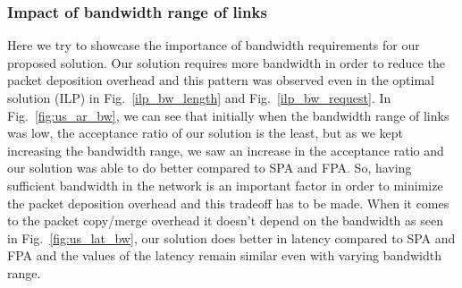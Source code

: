 \documentclass[journal]{IEEEtran}
\begin{document}
\subsubsection{Impact of bandwidth range of links}
Here we try to showcase the importance of bandwidth requirements for our proposed solution. Our solution requires more bandwidth in order to reduce the packet deposition overhead and this pattern was observed even in the optimal solution (ILP) in Fig.~\ref{ilp_bw_length} and Fig.~\ref{ilp_bw_request}. In Fig.~\ref{fig:us_ar_bw}, we can see that initially when the bandwidth range of links was low, the acceptance ratio of our solution is the least, but as we kept increasing the bandwidth range, we saw an increase in the acceptance ratio and our solution was able to do better compared to SPA and FPA. So, having sufficient bandwidth in the network is an important factor in order to minimize the packet deposition overhead and this tradeoff has to be made. When it comes to the packet copy/merge overhead it doesn't depend on the bandwidth as seen in Fig.~\ref{fig:us_lat_bw}, our solution does better in latency compared to SPA and FPA and the values of the latency remain similar even with varying bandwidth range.
    
    
    
\end{document}
